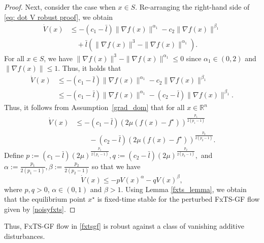 \documentclass[letterpaper]{article}
\begin{document}
\begin{proof}
Next, consider the case when $x\in S$. Re-arranging the right-hand side of \eqref{eq: dot V robust proof}, we obtain
\begin{align*}
\dot{V}(x) &\leq -(c_1 -\bar{l})\|\nabla f(x)\|^{\alpha_1} -c_2\|\nabla f(x)\|^{\beta_1} \\ &\quad
+\bar{l}\left(\|\nabla f(x)\|^3 - \|\nabla f(x)\|^{\alpha_1} \right).
\end{align*}
For all $x\in S$, we have $\|\nabla f(x)\|^3 - \|\nabla f(x)\|^{\alpha_1} \leq 0$ since $\alpha_1 \in (0,2)$ and $\|\nabla f(x)\|\leq 1$. Thus, it holds that
\begin{align*}
\dot{V}(x) &\leq -(c_1 -\bar{l})\|\nabla f(x)\|^{\alpha_1} -c_2\|\nabla f(x)\|^{\beta_1} \\ 
&\leq -(c_1 -\bar{l})\|\nabla f(x)\|^{\alpha_1} -(c_2-\bar{l})\|\nabla f(x)\|^{\beta_1}.
\end{align*}
Thus, it follows from Assumption~\ref{grad_dom} that for all $x\in \mathbb R^n$
\begin{align*}
\dot{V}(x) &\leq -(c_1-\bar{l})(2\mu(f(x)-f^\star))^{\frac{p_1}{2(p_1-1)}} \\
&\qquad -(c_2-\bar{l})(2\mu(f(x)-f^\star))^{\frac{p_2}{2(p_2-1)}}.
\end{align*}
Define $p := (c_1-\bar{l}) (2\mu)^{\frac{p_1}{2(p_1-1)}}, q := (c_2-\bar{l}) (2\mu)^{\frac{p_2}{2(p_2-1)}},$ and $\alpha:= \frac{p_1}{2(p_1-1)}, \beta:=\frac{p_2}{2(p_2-1)}$ so that we have 
\[\dot{V}(x) \leq -p V(x)^{\alpha}-q V(x)^{\beta},\]
where $p,q>0$, $\alpha \in (0,1)$ and $\beta>1$. Using Lemma \ref{fxts_lemma}, we obtain that the equilibrium point $x^\star$ is fixed-time stable for the perturbed FxTS-GF flow given by \eqref{noisyfxts}.
\end{proof}

Thus, FxTS-GF flow in \eqref{fxtsgf} is robust against a class of vanishing additive disturbances. 
\end{document}
